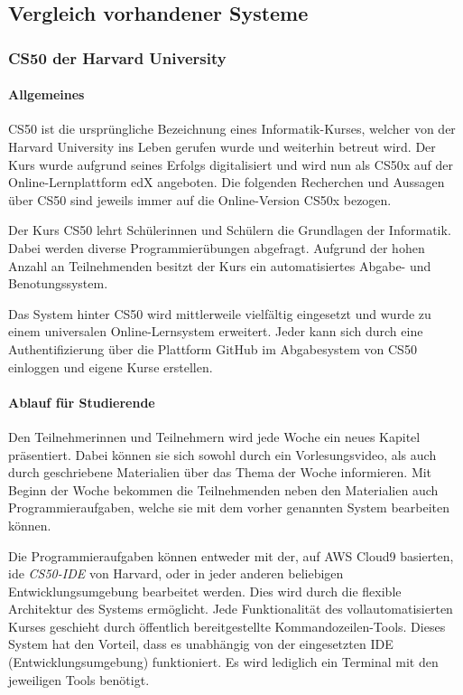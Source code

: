 \subsection{Vergleich vorhandener Systeme}
\subsubsection{CS50 der Harvard University}
\paragraph{Allgemeines}
CS50 ist die ursprüngliche Bezeichnung eines Informatik-Kurses, welcher von der
Harvard University ins Leben gerufen wurde und weiterhin betreut wird. Der Kurs
wurde aufgrund seines Erfolgs digitalisiert und wird nun als CS50x auf der
Online-Lernplattform edX angeboten. Die folgenden Recherchen und Aussagen über
CS50 sind jeweils immer auf die Online-Version CS50x bezogen.

Der Kurs CS50 lehrt Schülerinnen und Schülern die Grundlagen der Informatik.
Dabei werden diverse Programmierübungen abgefragt. Aufgrund der hohen Anzahl an
Teilnehmenden besitzt der Kurs ein automatisiertes Abgabe- und Benotungssystem.

Das System hinter CS50 wird mittlerweile vielfältig eingesetzt und wurde zu
einem universalen Online-Lernsystem erweitert. Jeder kann sich durch eine
Authentifizierung über die Plattform GitHub im Abgabesystem von CS50 einloggen
und eigene Kurse erstellen. \parencite{cs50}

\paragraph{Ablauf für Studierende}
Den Teilnehmerinnen und Teilnehmern wird jede Woche ein neues Kapitel
präsentiert. Dabei können sie sich sowohl durch ein Vorlesungsvideo, als auch
durch geschriebene Materialien über das Thema der Woche informieren. Mit Beginn
der Woche bekommen die Teilnehmenden neben den Materialien auch
Programmieraufgaben, welche sie mit dem vorher genannten System bearbeiten
können. \parencite{cs50-edx}

Die Programmieraufgaben können entweder mit der, auf AWS Cloud9 basierten,
\ac{ide} \emph{CS50-IDE} von Harvard, oder in jeder anderen beliebigen
Entwicklungsumgebung bearbeitet werden. Dies wird durch die flexible Architektur
des Systems ermöglicht. Jede Funktionalität des vollautomatisierten Kurses
geschieht durch öffentlich bereitgestellte Kommandozeilen-Tools. Dieses System
hat den Vorteil, dass es unabhängig von der eingesetzten IDE
(Entwicklungsumgebung) funktioniert. Es wird lediglich ein Terminal mit den
jeweiligen Tools benötigt. \parencite{cs50-ide}

